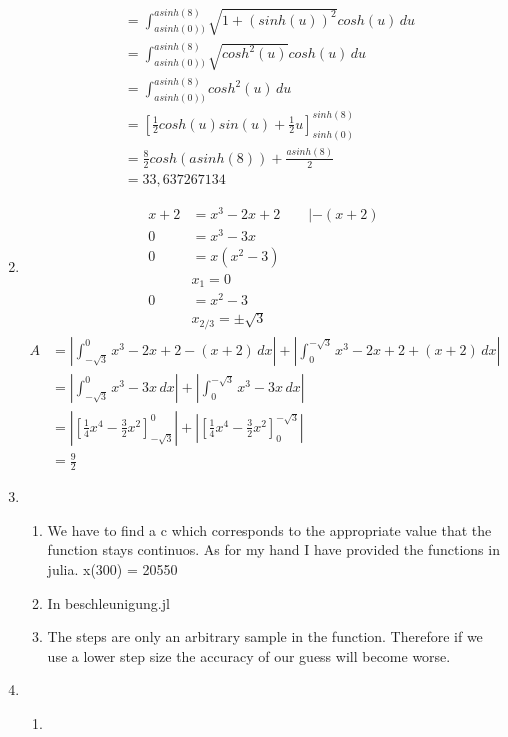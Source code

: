 \documentclass[]{book}
\theoremstyle{definition}
\begin{document}
\begin{enumerate}
\begin{align*}
        & = \int_{asinh(0))}^{asinh(8)} \sqrt{1 + (sinh(u))^2} cosh(u) \, du \\
        & = \int_{asinh(0))}^{asinh(8)} \sqrt{cosh^2(u)} cosh(u) \, du \\
        & = \int_{asinh(0))}^{asinh(8)} cosh^2(u) \, du \\
        & = [\frac{1}{2}cosh(u)sin(u) + \frac{1}{2}u]_{sinh(0)}^{sinh(8)} \\
        & = \frac{8}{2}cosh(asinh(8)) + \frac{asinh(8)}{2} \\
        & = 33,637267134
    \end{align*}
    \item \begin{align*}
         x + 2 & = x^3 - 2x + 2 \qquad |-(x + 2) \\
         0 & = x^3 - 3x \\
         0 & = x(x^2 - 3)\\
         & x_1 = 0\\
         0 & = x^2 - 3\\
        & x_{2/3} = \pm\sqrt{3}
    \end{align*}
    \begin{align*}
        A & = |\int_{-\sqrt{3}}^0 x^3 - 2x +2 - (x + 2)\, dx| + |\int_0^{-\sqrt{3}} x^3 - 2x +2 + (x + 2)\, dx| \\ 
        & = |\int_{-\sqrt{3}}^0 x^3 - 3x \, dx| + |\int_0^{-\sqrt{3}} x^3 - 3x\, dx| \\
        & = |[\frac{1}{4}x^4 - \frac{3}{2}x^2]_{-\sqrt{3}}^0| + |[\frac{1}{4}x^4 - \frac{3}{2}x^2]_0^{-\sqrt{3}}| \\
        & = \frac{9}{2}
    \end{align*}
    \item \begin{enumerate}
        \item We have to find a c which corresponds to the appropriate value that the function stays continuos. As for my hand I have provided the functions in julia. x(300) = 20550 
        \item In beschleunigung.jl
        \item The steps are only an arbitrary sample in the function. Therefore if we use a lower step size the accuracy of our guess will become worse. 
    \end{enumerate}
    \item \begin{enumerate}
        \item \begin{align*}

\end{align*}
\end{enumerate}
\end{enumerate}
\end{document}
